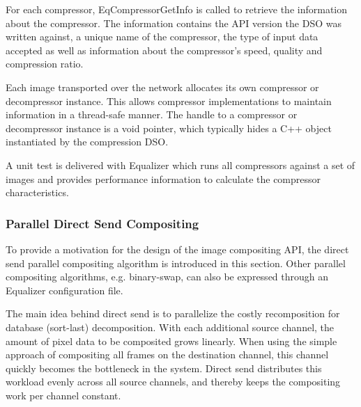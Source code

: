 \documentclass[10pt,a4]{scrartcl}
\begin{document}
For each compressor, \textsf{EqCompressorGetInfo} is called to retrieve
the information about the compressor. The information contains the API
version the DSO was written against, a unique name of the compressor,
the type of input data accepted as well as information about the
compressor's speed, quality and compression ratio.

Each image transported over the network allocates its own compressor or
decompressor instance. This allows compressor implementations to
maintain information in a thread-safe manner. The handle to a compressor
or decompressor instance is a void pointer, which typically hides a C++
object instantiated by the compression DSO.

A unit test is delivered with Equalizer which runs all compressors
against a set of images and provides performance information to
calculate the compressor characteristics.



\subsubsection{\label{sDirectSend}Parallel Direct Send Compositing}

To provide a motivation for the design of the image compositing
API, the direct send parallel compositing algorithm is introduced in this
section. Other parallel compositing algorithms, e.g. binary-swap, can
also be expressed through an Equalizer configuration file.

The main idea behind direct send is to parallelize the costly
recomposition for database (sort-last) decomposition. With each
additional source channel, the amount of pixel data to be composited
grows linearly. When using the simple approach of compositing all frames
on the destination channel, this channel quickly becomes the bottleneck
in the system. Direct send distributes this workload evenly across all
source channels, and thereby keeps the compositing work per channel
constant.
\end{document}
